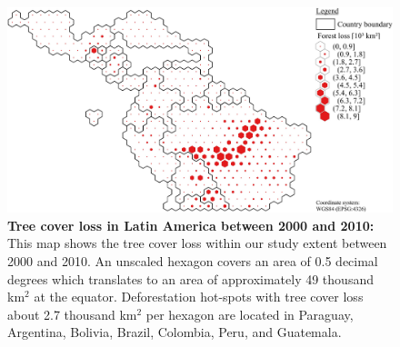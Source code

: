 			\begin{figure}[ht]
				\centering
				\includegraphics[scale=.9]{img/americas_loss_frameless}
				\caption[Tree cover loss in Latin America between 2000 and 2010]{\textbf{Tree cover loss in Latin America between 2000 and 2010:} This map shows the tree cover loss within our study extent between 2000 and 2010. An unscaled hexagon covers an area of 0.5 decimal degrees which translates to an area of approximately 49 thousand km$^2$ at the equator. Deforestation hot-spots with tree cover loss about 2.7 thousand km$^2$ per hexagon are located in Paraguay, Argentina, Bolivia, Brazil, Colombia, Peru, and Guatemala.}
				\label{fig:americas_loss}
			\end{figure}

